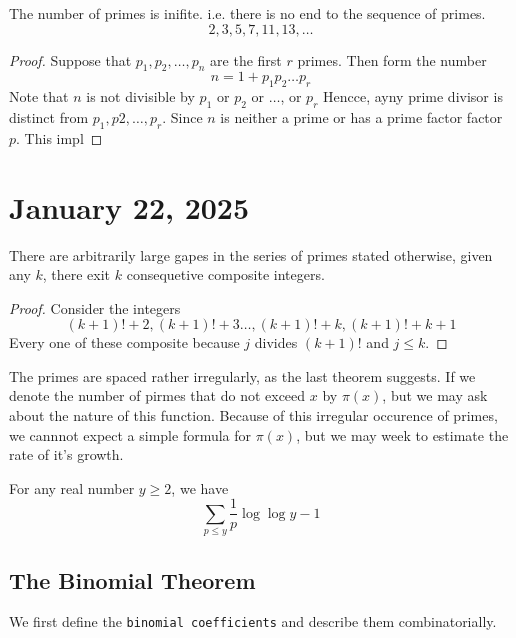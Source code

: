 \documentclass[11pt]{article}
\begin{document}
\begin{theorem}[Euclid]\label{1.17}
	The number of primes is inifite. i.e. there is no end to the sequence of primes. \[2, 3, 5, 7, 11, 13, \ldots\]
\end{theorem}

\begin{proof}
	Suppose that \(p_1, p_2, \ldots, p_n\) are the first \(r\) primes. Then form the number \[n = 1 + p_1 p_2\ldots p_r\]
	Note that \(n\) is not divisible by \(p_1\) or \(p_2\) or \(\ldots\), or
	\(p_r\) Hencce, ayny prime divisor is distinct from \(p_1, p2, \ldots, p_r\).
	Since \(n\) is neither a prime or has a prime factor factor \(p\). This impl
\end{proof}
\section{January 22, 2025}
\begin{theorem}\label{1.18}
	There are arbitrarily large gapes in the series of primes stated otherwise, given any \(k\), there exit \(k\) consequetive composite integers.
\end{theorem}
\begin{proof}
	Consider the integers
	\[(k + 1)! + 2, (k + 1)! + 3 \ldots, (k + 1)! + k, (k + 1)! + k + 1\]
	Every one of these composite because \(j\) divides \((k + 1)!\) and \(j
	\leqslant k\).
\end{proof}

The primes are spaced rather irregularly, as the last theorem suggests. If we
denote the number of pirmes that do not exceed \(x\) by \(\pi(x)\), but we may
ask about the nature of this function. Because of this irregular occurence of
primes, we cannnot expect a simple formula for \(\pi(x)\), but we may week to
estimate the rate of it's growth.

\begin{theorem}\label{1.19}
	For any real number \(y \geqslant 2\), we have
	\[\sum_{p \leqslant y} \frac{1}{p} \log \log y - 1\]
\end{theorem}

\subsection{The Binomial Theorem}
We first define the \texttt{binomial coefficients} and describe them
combinatorially.
\end{document}
